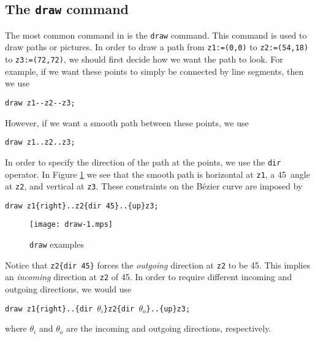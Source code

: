 \subsection{The \texttt{draw} command}

The most common command in \MP{} is the \texttt{draw} command.  This
command is used to draw paths or pictures.  In order to draw a path from
\texttt{z1:=(0,0)} to \texttt{z2:=(54,18)} to \texttt{z3:=(72,72)}, we
should first decide how we want the path to look.  For example, if we
want these points to simply be connected by line segments, then we
use

\begin{center}
  \verb|draw z1--z2--z3;|
\end{center}

However, if we want a smooth path between these points, we use

\begin{center}
  \verb|draw z1..z2..z3;|
\end{center}

In order to specify the direction of the path at the points, we use the
\texttt{dir} operator.  In Figure \ref{fig:draw1} we see that the smooth
path is horizontal at \texttt{z1}, a 45\textdegree\ angle at
\texttt{z2}, and vertical at \texttt{z3}.  These constraints on the
B\'{e}zier curve are imposed by

\begin{center}
  \verb|draw z1{right}..z2{dir 45}..{up}z3;|
\end{center}

\begin{figure}
  \centering
  \texttt{[image: draw-1.mps]}
  \caption{\texttt{draw} examples}
  \label{fig:draw1}
\end{figure}

Notice that \verb|z2{dir 45}| forces the \textit{outgoing} direction at
\texttt{z2} to be 45\textdegree.  This implies an \textit{incoming}
direction at \texttt{z2} of 45\textdegree.  In order to require
different incoming and outgoing directions, we would use

\begin{center}
  \verb|draw z1{right}..{dir |$\theta_i$\verb|}z2{dir |$\theta_o$\verb|}..{up}z3;|
\end{center}
where $\theta_i$ and $\theta_o$ are the incoming and outgoing
directions, respectively.
